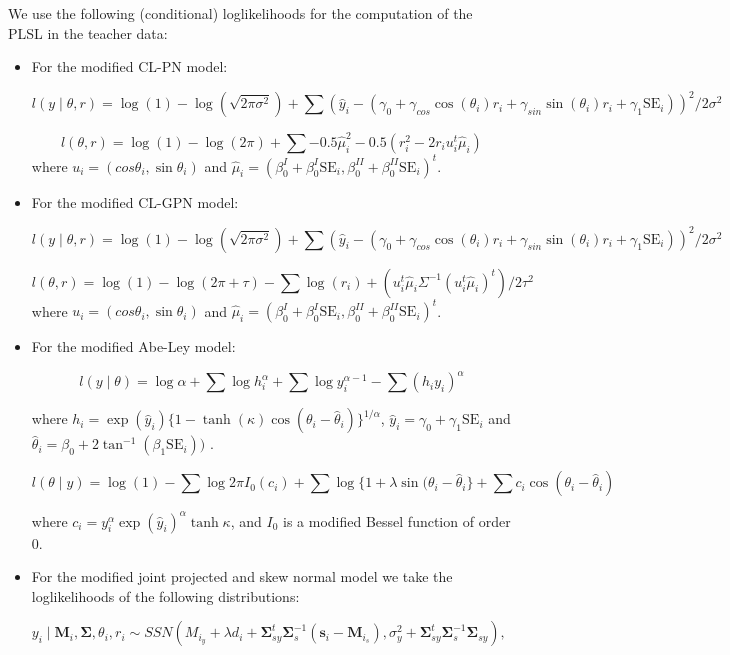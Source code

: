 \documentclass[12pt,]{article}
\begin{document}
\indent We use the following (conditional) loglikelihoods for the
computation of the PLSL in the teacher data:

\begin{itemize}
\item For the modified CL-PN model:

$$l(y \mid \theta, r) = \log(1) - \log(\sqrt{2\pi\sigma^2}) + \sum(\hat{y}_i-(\gamma_0 + \gamma_{cos}\cos(\theta_i)r_i +
\gamma_{sin}\sin(\theta_i)r_i + \gamma_1\text{SE}_i))^2/2\sigma^2$$

$$l(\theta, r) = \log(1) - \log(2\pi) + \sum -0.5\hat{\mu}_i^2 - 0.5(r_i^2 - 2r_iu_i^t\hat{\mu}_i)$$
where $u_i = (cos\theta_i, \sin \theta_i)$ and $\hat{\mu}_i = (\beta_0^{I} + \beta_0^{I}\text{SE}_i, \beta_0^{II} + \beta_0^{II}\text{SE}_i)^t$.

\item For the modified CL-GPN model:

$$l(y \mid \theta, r) = \log(1) - \log(\sqrt{2\pi\sigma^2}) + \sum(\hat{y}_i-(\gamma_0 + \gamma_{cos}\cos(\theta_i)r_i +
\gamma_{sin}\sin(\theta_i)r_i + \gamma_1\text{SE}_i))^2/2\sigma^2$$

$$l(\theta, r) =  \log(1) - \log(2\pi+\tau) - \sum \log(r_i) + (u_i^t\hat{\mu}_i\Sigma^{-1}(u_i^t\hat{\mu}_i)^t)/2\tau^2$$
where $u_i = (cos\theta_i, \sin \theta_i)$ and $\hat{\mu}_i = (\beta_0^{I} + \beta_0^{I}\text{SE}_i, \beta_0^{II} + \beta_0^{II}\text{SE}_i)^t$.


\item For the modified Abe-Ley model:


$$l(y \mid \theta) = \log\alpha + \sum\log h_i^\alpha + \sum\log y_i^{\alpha - 1} - \sum(h_iy_i)^\alpha$$

where $h_i = \exp(\hat{y}_i)\{1-\tanh(\kappa)\cos(\theta_i - \hat{\theta}_i)\}^{1/\alpha}$, $\hat{y}_i = \gamma_0 + \gamma_1\text{SE}_i$ and $\hat{\theta}_i = \beta_0 +  2\tan^{-1}(\beta_1\text{SE}_i))$ .

$$l(\theta \mid y) = \log(1) - \sum\log 2\pi I_0(c_i) + \sum\log\{1 + \lambda \sin(\theta_i - \hat{\theta}_i\} + \sum c_i\cos(\theta_i - \hat{\theta}_i)$$

where $c_i = y_i^{\alpha}\exp(\hat{y}_i)^{\alpha}\tanh\kappa$, and $I_{0}$ is a modified Bessel function of order $0$.


\item For the modified joint projected and skew normal model we take the loglikelihoods of the following distributions:

$y_i \mid \boldsymbol{M}_i, \boldsymbol{\Sigma}, \theta_i, r_i \sim SSN(M_{i_y} + \lambda d_i + \boldsymbol{\Sigma}_{sy}^t\boldsymbol{\Sigma}_s^{-1}(\boldsymbol{s}_i - \boldsymbol{M}_{i_s}), \sigma^2_y + \boldsymbol{\Sigma}_{sy}^t\boldsymbol{\Sigma}_s^{-1}\boldsymbol{\Sigma}_{sy}),$


\end{itemize}
\end{document}
